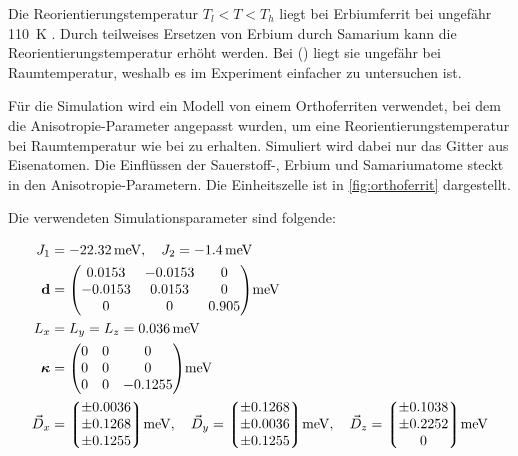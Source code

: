 \documentclass[main.tex]{subfiles}
\begin{document}

Die Reorientierungstemperatur \(T_l < T < T_h\) liegt bei Erbiumferrit bei
ungefähr \SI{110}{\kelvin} \cite{Deng2015}. Durch teilweises Ersetzen von
Erbium durch Samarium kann die Reorientierungstemperatur erhöht werden. Bei
() liegt sie ungefähr bei Raumtemperatur, weshalb es
im Experiment einfacher zu untersuchen ist. 


Für die Simulation wird ein Modell von einem Orthoferriten verwendet, bei dem
die Anisotropie-Parameter angepasst wurden, um eine Reorientierungstemperatur
bei Raumtemperatur wie bei  zu erhalten.
Simuliert wird dabei nur das Gitter aus Eisenatomen. Die Einflüssen der
Sauerstoff-, Erbium und Samariumatome steckt in den Anisotropie-Parametern. Die
Einheitszelle ist in \cref{fig:orthoferrit} dargestellt.

Die verwendeten Simulationsparameter sind folgende:

\begin{align}
	J_1           & = \SI{-22,32}{\milli\electronvolt}, \quad J_2 =
	\SI{-1,4}{\milli\electronvolt}\label{eq:params-exc}
	\\
	\mat{d}       & = \mqty(
	\num{0.0153}  & \num{-0.0153}                                   & 0
	\\
	\num{-0.0153} & \num{0.0153}                                    & 0
	\\
	0             & 0                                               &
	\num{0.905})\si{\milli\electronvolt} \label{eq:params-2a}
	\\
	L_x           & = L_y = L_z =
	\SI{0.036}{\milli\electronvolt}\label{eq:params-4a}
	\\
	\mat{\kappa}  & = \mqty(
	0             & 0                                               & 0
	\\
	0             & 0                                               & 0
	\\
	0             & 0                                               &
	\num{-0.1255})\si{\milli\electronvolt} \label{eq:params-tia}
	\\
	\vec{D}_x     & = \mqty*(\num{\pm 0.0036}
	\\ \num{\pm 0.1268} \\ \num{\pm
		0.1255})\si{\milli\electronvolt} , \quad
	\vec{D}_y = \mqty*(\num{\pm 0.1268}
	\\ \num{\pm 0.0036} \\ \num{\pm
		0.1255})\si{\milli\electronvolt} , \quad
	\vec{D}_z = \mqty*(\num{\pm 0.1038}
	\\ \num{\pm 0.2252} \\ 0)\si{\milli\electronvolt} \label{eq:params-dmi}
\end{align}
\end{document}
